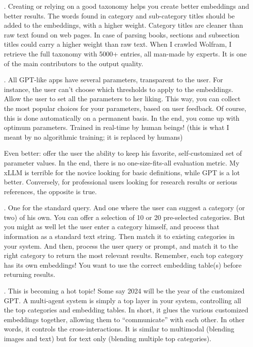 \documentclass[oneside,10pt]{book}
\begin{document}
\vspace{1ex}
. Creating or relying on a good taxonomy helps you create better embeddings and better results. The words found in category and sub-category titles should be added to the embeddings, with a higher weight. Category titles are cleaner than raw text found on web pages. In case of parsing books, sections and subsection titles could carry a higher weight than raw text. When I crawled Wolfram, I retrieve the full taxonomy with 5000+ entries, all man-made by experts. It is one of the main contributors to the output quality.


\vspace{1ex}
. All GPT-like apps have several parameters, transparent to the user. For instance, the user can’t choose which thresholds to apply to the embeddings. Allow the user to set all the parameters to her liking. This way, you can collect the most popular choices for your parameters, based on user feedback. Of course, this is done automatically on a permanent basis. In the end, you come up with optimum parameters. Trained in real-time by human beings! (this is what I meant by no algorithmic training; it is replaced by humans)

Even better: offer the user the ability to keep his favorite, self-customized set of parameter values. In the end, there is no one-size-fits-all evaluation metric. My xLLM is terrible for the novice looking for basic definitions, while GPT is a lot better. Conversely, for professional users looking for research results or serious references, the opposite is true.

\vspace{1ex}
. One for the standard query. And one where the user can suggest a category (or two) of his own. You can offer a selection of 10 or 20 pre-selected categories. But you might as well let the user enter a category himself, and process that information as a standard text string. Then match it to existing categories in your system. And then, process the user query or prompt, and match it to the right category to return the most relevant results. Remember, each top category has its own embeddings! You want to use the correct embedding table(s) before returning results.

\vspace{1ex}
. This is becoming a hot topic! Some say 2024 will be the year of the customized GPT. A 
\textcolor{index}{multi-agent system} is simply a top layer in your system, controlling all the top categories and embedding tables. In short, it glues the various customized embeddings together, allowing them to “communicate” with each other. In other words, it controls the cross-interactions. It is similar to multimodal (blending images and text) but for text only (blending multiple top categories).
\end{document}
